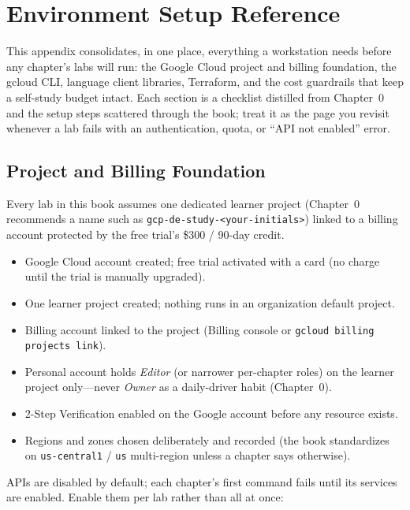\chapter{Environment Setup Reference}
%
This appendix consolidates, in one place, everything a workstation needs before any chapter's
labs will run: the Google Cloud project and billing foundation, the gcloud CLI, language client
libraries, Terraform, and the cost guardrails that keep a self-study budget intact. Each section
is a checklist distilled from Chapter~0 and the setup steps scattered through the book; treat it
as the page you revisit whenever a lab fails with an authentication, quota, or ``API not
enabled'' error.

\section{Project and Billing Foundation}
%
Every lab in this book assumes one dedicated learner project (Chapter~0 recommends a name such as
\texttt{gcp-de-study-<your-initials>}) linked to a billing account protected by the free trial's
\$300 / 90-day credit.

\begin{itemize}
    \item[$\square$] Google Cloud account created; free trial activated with a card (no charge
    until the trial is manually upgraded).
    \item[$\square$] One learner project created; nothing runs in an organization default project.
    \item[$\square$] Billing account linked to the project (Billing console or
    \texttt{gcloud billing projects link}).
    \item[$\square$] Personal account holds \emph{Editor} (or narrower per-chapter roles) on the
    learner project only---never \emph{Owner} as a daily-driver habit (Chapter~0).
    \item[$\square$] 2-Step Verification enabled on the Google account before any resource exists.
    \item[$\square$] Regions and zones chosen deliberately and recorded (the book standardizes on
    \texttt{us-central1} / \texttt{us} multi-region unless a chapter says otherwise).
\end{itemize}

\noindent APIs are disabled by default; each chapter's first command fails until its services are
enabled. Enable them per lab rather than all at once:

